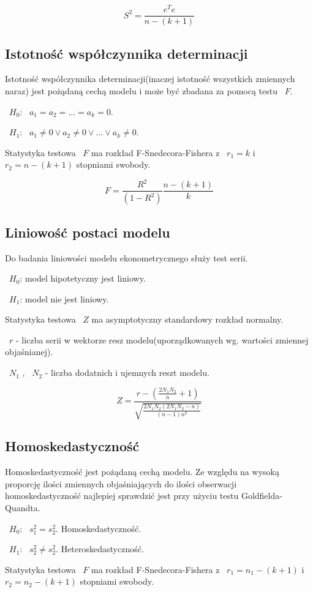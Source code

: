 \documentclass{article}
\begin{document}
\[S^2 = \frac{e^Te}{n - (k + 1)}\]

\newpage
\subsection{Istotność współczynnika determinacji}
Istotność współczynnika determinacji(inaczej istotność wszystkich zmiennych naraz) jest pożądaną cechą modelu i może być zbadana za pomocą testu ~$F$.

~$H_0$: ~$a_1 = a_2 = ... = a_k = 0$.

~$H_1$: ~$a_1 \neq 0 \vee a_2 \neq 0 \vee ... \vee a_k \neq 0$.

Statystyka testowa ~$F$ ma rozkład F-Snedecora-Fishera z ~$r_1 = k$ i ~$r_2 = n - (k + 1)$ stopniami swobody.

\[F = \frac{R^2}{(1-R^2)}\frac{n - (k + 1)}{k}\]

\subsection{Liniowość postaci modelu}
Do badania liniowości modelu ekonometrycznego służy test serii.

~$H_0$: model hipotetyczny jest liniowy.

~$H_1$: model nie jest liniowy.

Statystyka testowa ~$Z$ ma asymptotyczny standardowy rozkład normalny.

~$r$ - liczba serii w wektorze resz modelu(uporządkowanych wg. wartości zmiennej objaśnianej).

~$N_1$ , ~$N_2$ - liczba dodatnich i ujemnych reszt modelu.

\[Z = \frac{r-(\frac{2N_1N_2}{n}+1)}{\sqrt{\frac{2N_1N_2(2N_1N_2-n)}{(n-1)n^2}}}\]

\subsection{Homoskedastyczność}
Homoskedastyczność jest pożądaną cechą modelu. Ze względu na wysoką proporcję ilości zmiennych objaśniających do ilości obserwacji homoskedastyczność najlepiej sprawdzić jest przy użyciu testu Goldfielda-Quandta.

~$H_0$: ~$s_1^2 = s_2^2$. Homoskedastyczność.

~$H_1$: ~$s_2^2 \neq s_2^2$. Heteroskedastyczność.

Statystyka testowa ~$F$ ma rozkład F-Snedecora-Fishera z ~$r_1 = n_1 - (k+1)$ i ~$r_2 = n_2 - (k + 1)$ stopniami swobody.
\end{document}

